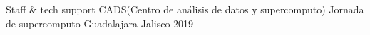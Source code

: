 \begin{cvhonors}
  \cvhonor
    {Staff \& tech support}
    {CADS(Centro de análisis de datos y supercomputo) Jornada de supercomputo}
    {Guadalajara Jalisco}
    {2019}
\end{cvhonors}
